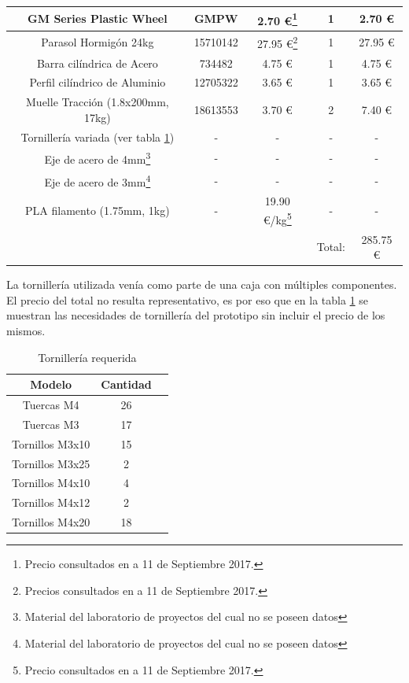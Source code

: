 \begin{table}[H]
\begin{center}
\begin{minipage}{\textwidth}
\begin{tabular}{ |c|c|c|c|c| }
    \hline
    \hline
    GM Series Plastic Wheel & GMPW & 2.70 \euro\footnote{Precio consultados en \cite{solarBotics} a 11 de Septiembre 2017.} & 1 & 2.70 \euro \\
    \hline
    \hline
    Parasol Hormigón 24kg & 15710142 & 27.95 \euro\footnote{Precios consultados en \cite{leroyMerlin} a 11 de Septiembre 2017.} & 1 & 27.95 \euro \\
    Barra cilíndrica de Acero & 734482 & 4.75 \euro & 1 & 4.75 \euro \\
    Perfil cilíndrico de Aluminio & 12705322 & 3.65 \euro & 1 & 3.65 \euro \\
    Muelle Tracción (1.8x200mm, 17kg) &  18613553 & 3.70 \euro & 2 & 7.40 \euro \\
    \hline
    \hline
    Tornillería variada (ver tabla \ref{tab:tornilleria}) &  - & -  & - & - \\
    Eje de acero de 4mm\footnote{Material del laboratorio de proyectos del cual no se poseen datos}  &  - & -  & - & - \\
    Eje de acero de 3mm\footnote{Material del laboratorio de proyectos del cual no se poseen datos}  &  - & -  & - & - \\
    \hline
    \hline
    PLA filamento (1.75mm, 1kg) &  - & 19.90 \euro/kg\footnote{Precio consultados en \cite{bq} a 11 de Septiembre 2017.} & - & - \\
    \hline
    \hline
    & & & Total: & 285.75 \euro \\
    \hline
    \end{tabular}
    \end{minipage}
    \end{center}
    \end{table}
    
    La tornillería utilizada venía como parte de una caja con múltiples componentes. El precio del total no resulta representativo, es por eso que en la tabla \ref{tab:tornilleria} se muestran las necesidades de tornillería del prototipo sin incluir el precio de los mismos.
    
    \begin{table}[H]
    	\caption{Tornillería requerida}
    	\label{tab:tornilleria}
    	\begin{center}
    		\begin{tabular}{ |c|c|c| }
   			\hline
    		Modelo & Cantidad \\
    		\hline
    		Tuercas M4 & 26 \\
    		Tuercas M3 & 17 \\
    		Tornillos M3x10 & 15 \\
    		Tornillos M3x25 & 2 \\
    		Tornillos M4x10 & 4 \\
    		Tornillos M4x12 & 2 \\
    		Tornillos M4x20 & 18 \\
    		\hline
    	\end{tabular}
	\end{center}
	\end{table}

